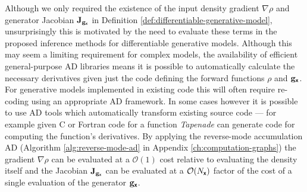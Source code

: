 Although we only required the existence of the input density gradient $\nabla{\rho}$ and generator Jacobian $\mathbf{J}_{{\mathbf{g}}_{\boldsymbol{\mathsf{x}}}}$ in Definition \ref{def:differentiable-generative-model}, unsurprisingly this is motivated by the need to evaluate these terms in the proposed inference methods for differentiable generative models. Although this may seem a limiting requirement for complex models, the availability of efficient general-purpose \ac{AD} libraries \citep{baydin2015automatic} means it is possible to automatically calculate the necessary derivatives given just the code defining the forward functions $\rho$ and ${\mathbf{g}}_{\boldsymbol{\mathsf{x}}}$. For generative models implemented in existing code this will often require re-coding using an appropriate \ac{AD} framework. In some cases however it is possible to use \ac{AD} tools which automatically transform existing source code --- for example given C or Fortran code for a function \emph{Tapenade} \citep{hascoet2013tapenade} can generate code for computing the function's derivatives. By applying the reverse-mode accumulation \ac{AD} (Algorithm \ref{alg:reverse-mode-ad} in Appendix \ref{ch:computation-graphs}) the gradient $\nabla{\rho}$  can be evaluated at a $\mathcal{O}(1)$ cost relative to evaluating the density itself and the Jacobian $\mathbf{J}_{{\mathbf{g}}_{\boldsymbol{\mathsf{x}}}}$ can be evaluated at a $\mathcal{O}(N_{\boldsymbol{\mathsf{x}}})$ factor of the cost of a single evaluation of the generator ${\mathbf{g}}_{\boldsymbol{\mathsf{x}}}$.


